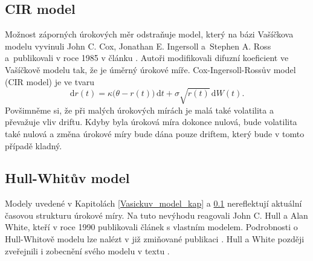 \documentclass[a4paper,12pt]{report}
\theoremstyle{definition} \newtheorem{definice}[veta]{Definice}
\theoremstyle{remark}
\begin{document}
\subsection{CIR model}\label{CIR_model_kap}
Možnost záporných úrokových měr odstraňuje model, který na bázi Vašíčkova modelu vyvinuli John C. Cox, Jonathan E. Ingersoll a~Stephen A. Ross a~publikovali v roce 1985 v článku \cite{cox1985theory}.
Autoři modifikovali difuzní koeficient ve Vašíčkově modelu tak, že je úměrný úrokové míře.
Cox-Ingersoll-Rossův model (CIR model) je ve tvaru 
\begin{equation}\label{CIR_model}
\mathrm{d}r(t) = \kappa\big(\theta - r(t)\big)\,\mathrm{d}t + \sigma\sqrt{r(t)}\,\mathrm{d}W(t).
\end{equation}
Povšimněme si, že při malých úrokových mírách je malá také volatilita a převažuje vliv driftu. Kdyby byla úroková míra dokonce nulová, bude volatilita také nulová a změna úrokové míry bude dána pouze driftem, který bude v tomto případě kladný.


\subsection{Hull-Whitův model}\label{H-W_model_kap}
Modely uvedené v Kapitolách \ref{Vasickuv_model_kap} a \ref{CIR_model_kap} nereflektují aktuální časovou strukturu úrokové míry.
Na tuto nevýhodu reagovali John C. Hull a Alan White, kteří v roce 1990 publikovali článek \cite{hull1990pricing} s vlastním modelem. %
Podrobnosti o Hull-Whitově modelu lze nalézt v již zmiňované publikaci \cite{brigo2007interest}.
Hull a White později zveřejnili i zobecnění svého modelu v textu \cite{hull2001general}.
\end{document}
